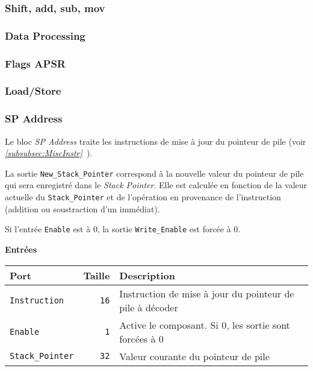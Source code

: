 \subsubsection{Shift, add, sub, mov}

\subsubsection{Data Processing}

\subsubsection{Flags APSR}

\subsubsection{Load/Store}

\subsubsection{SP Address}


Le bloc \textit{SP Address} traite les instructions de mise à jour du pointeur de pile (voir \textit{\ref{subsubsec:MiscInstr}~}).

La sortie \texttt{New\_Stack\_Pointer} correspond à la nouvelle valeur du pointeur de pile qui sera enregistré dans le \textit{Stack Pointer}.
Elle est calculée en fonction de la valeur actuelle du \texttt{Stack\_Pointer} et de l'opération en provenance de l'instruction (addition ou soustraction d'un immédiat).

Si l'entrée \texttt{Enable} est à 0, la sortie \texttt{Write\_Enable} est forcée à 0.


\textbf{Entrées}\\

\begin{tabular}{|l|r|l|}
\hline
\textbf{Port}		& \textbf{Taille} & \textbf{Description}\\
\hline

\texttt{Instruction}	& \texttt{16} & Instruction de mise à jour du pointeur de pile à décoder\\
\hline
\texttt{Enable}		&  \texttt{1} & Active le composant. Si 0, les sortie sont forcées à 0\\
\hline
\texttt{Stack\_Pointer}	&  \texttt{32} & Valeur courante du pointeur de pile\\

\hline
\end{tabular}

